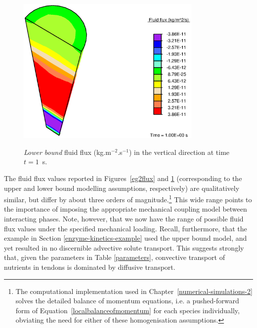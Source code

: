 \begin{figure}[!hpt]
  \centering
      {\includegraphics[width=0.8\textwidth]{images/examples/lagrangian/constriction/lower-bound-flux}}
      \caption{{\em Lower bound} fluid flux (kg.m$^{-2}$.s$^{-1}$) in
        the vertical direction at time $t=1$~s.}
      \label{lowerbound}
\end{figure}

The fluid flux values reported in Figures~\ref{eg2flux} and
\ref{lowerbound} (corresponding to the upper and lower bound modelling
assumptions, respectively) are qualitatively similar, but differ by
about three orders of magnitude.\footnote{The computational
  implementation used in Chapter~\ref{numerical-simulations-2} solves
  the detailed balance of momentum equations, i.e. a pushed-forward
  form of Equation~\ref{localbalanceofmomentum} for each species
  individually, obviating the need for either of these homogenisation
  assumptions.} This wide range points to the importance of imposing
the appropriate mechanical coupling model between interacting
phases. Note, however, that we now have the range of possible fluid
flux values under the specified mechanical loading. Recall,
furthermore, that the example in Section \ref{enzyme-kinetics-example}
used the upper bound model, and yet resulted in no discernible
advective solute transport. This suggests strongly that, given the
parameters in Table \ref{parameters}, convective transport of
nutrients in tendons is dominated by diffusive transport.


